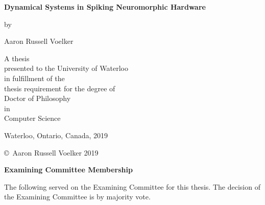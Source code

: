 \pagestyle{empty}

\begin{titlepage}
  \begin{center}
    \vspace*{1.0cm}

    \Huge
    {\bf Dynamical Systems in Spiking Neuromorphic Hardware}

    \vspace*{1.0cm}

    \normalsize
    by \\

    \vspace*{1.0cm}

    \Large
    Aaron Russell Voelker \\

    \vspace*{3.0cm}

    \normalsize
    A thesis \\
    presented to the University of Waterloo \\
    in fulfillment of the \\
    thesis requirement for the degree of \\
    Doctor of Philosophy \\
    in \\
    Computer Science \\

    \vspace*{2.0cm}

    Waterloo, Ontario, Canada, 2019 \\

    \vspace*{1.0cm}

    \copyright\ Aaron Russell Voelker 2019 \\
  \end{center}
\end{titlepage}

\pagestyle{plain}
\setcounter{page}{2}

\cleardoublepage

\begin{center}\textbf{Examining Committee Membership}\end{center}

\noindent
The following served on the Examining Committee for this thesis.
The decision of the Examining Committee is by majority vote.

